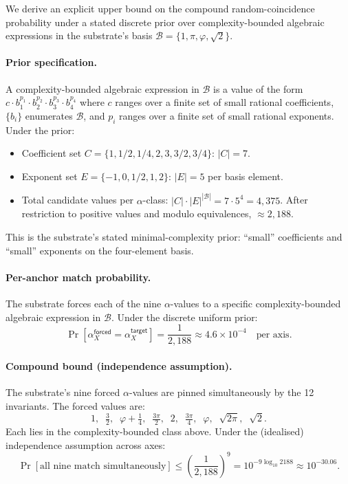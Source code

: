 \documentclass[11pt,a4paper]{amsart}
\theoremstyle{plain}
\theoremstyle{definition}
\begin{document}
We derive an explicit upper bound on the compound random-coincidence probability under a stated discrete prior over complexity-bounded algebraic expressions in the substrate's basis $\mathcal{B} = \{1, \pi, \varphi, \sqrt{2}\}$.

\paragraph{Prior specification.} A complexity-bounded algebraic expression in $\mathcal{B}$ is a value of the form $c \cdot b_1^{p_1} \cdot b_2^{p_2} \cdot b_3^{p_3} \cdot b_4^{p_4}$ where $c$ ranges over a finite set of small rational coefficients, $\{b_i\}$ enumerates $\mathcal{B}$, and $p_i$ ranges over a finite set of small rational exponents. Under the prior:
\begin{itemize}[itemsep=2pt,leftmargin=2em]
\item Coefficient set $C = \{1, 1/2, 1/4, 2, 3, 3/2, 3/4\}$: $|C| = 7$.
\item Exponent set $E = \{-1, 0, 1/2, 1, 2\}$: $|E| = 5$ per basis element.
\item Total candidate values per $\alpha$-class: $|C| \cdot |E|^{|\mathcal{B}|} = 7 \cdot 5^4 = 4{,}375$. After restriction to positive values and modulo equivalences, $\approx 2{,}188$.
\end{itemize}
This is the substrate's stated minimal-complexity prior: ``small'' coefficients and ``small'' exponents on the four-element basis.

\paragraph{Per-anchor match probability.} The substrate forces each of the nine $\alpha$-values to a specific complexity-bounded algebraic expression in $\mathcal{B}$. Under the discrete uniform prior:
\[
\Pr[\alpha_X^{\textsf{forced}} = \alpha_X^{\textsf{target}}] = \frac{1}{2{,}188} \approx 4.6 \times 10^{-4} \quad \text{per axis}.
\]

\paragraph{Compound bound (independence assumption).} The substrate's nine forced $\alpha$-values are pinned simultaneously by the 12 invariants. The forced values are:
\[
1,\;\; \tfrac{3}{2},\;\; \varphi + \tfrac{1}{4},\;\; \tfrac{3\pi}{2},\;\; 2,\;\; \tfrac{3\pi}{4},\;\; \varphi,\;\; \sqrt{2\pi},\;\; \sqrt{2}.
\]
Each lies in the complexity-bounded class above. Under the (idealised) independence assumption across axes:
\[
\Pr[\text{all nine match simultaneously}] \le \left(\frac{1}{2{,}188}\right)^9 = 10^{-9 \log_{10} 2188} \approx 10^{-30.06}.
\]
\end{document}
